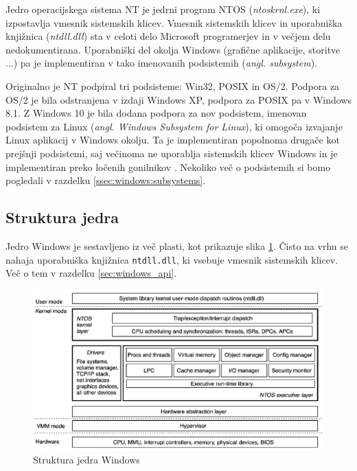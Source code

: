 \documentclass[a4paper,12pt,openright]{book}
\begin{document}
Jedro operacijskega sistema NT je jedrni program NTOS (\textit{ntoskrnl.exe}), ki izpostavlja vmesnik sistemskih klicev.
Vmesnik sistemskih klicev in uporabniška knjižnica (\textit{ntdll.dll}) sta v celoti delo Microsoft programerjev in v večjem delu nedokumentirana.
Uporabniški del okolja Windows (grafične aplikacije, storitve ...) pa je implementiran v tako imenovanih podsistemih (\textit{angl. subsystem}).

Originalno je NT podpiral tri podsisteme: Win32, POSIX in OS/2.
Podpora za OS/2 je bila odstranjena v izdaji Windows XP, podpora za POSIX pa v Windows 8.1.
Z Windows 10 je bila dodana podpora za nov podsistem, imenovan podsistem za Linux (\textit{angl. Windows Subsystem for Linux}), ki omogoča izvajanje Linux aplikacij v Windows okolju.
Ta je implementiran popolnoma drugače kot prejšnji podsistemi, saj večinoma ne uporablja sistemskih klicev Windows in je implementiran preko ločenih gonilnikov \cite{Yosifovich_Russinovich_Solomon_Ionescu_2017}.
Nekoliko več o podsistemih si bomo pogledali v razdelku \ref{ssec:windows:subsystems}.

\subsection{Struktura jedra}

Jedro Windows je sestavljeno iz več plasti, kot prikazuje slika \ref{fig:windows_kernel_structure}.
Čisto na vrhu se nahaja uporabniška knjižnica \texttt{ntdll.dll}, ki vsebuje vmesnik sistemskih klicev.
Več o tem v razdelku \ref{sec:windows_api}.

\begin{figure}[h!]
	\begin{center}
		\includegraphics[width=\textwidth]{images/windows_kernel_structure.png}
	\end{center}
	\caption{Struktura jedra Windows \cite{Tanenbaum_Bos_2023}}
	\label{fig:windows_kernel_structure}
\end{figure}
\end{document}

